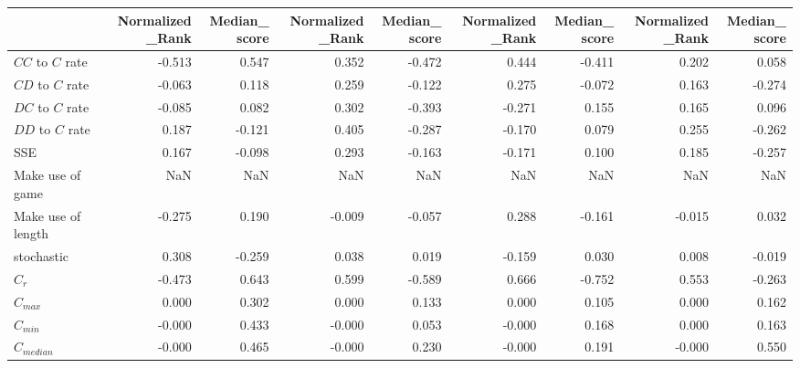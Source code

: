 \begin{tabular}{lrrrrrrrr}
\toprule
{} &  Normalized_Rank &  Median_score &  Normalized_Rank &  Median_score &  Normalized_Rank &  Median_score &  Normalized_Rank &  Median_score \\
\midrule
$CC$ to $C$ rate     &           -0.513 &         0.547 &            0.352 &        -0.472 &            0.444 &        -0.411 &            0.202 &         0.058 \\
$CD$ to $C$ rate     &           -0.063 &         0.118 &            0.259 &        -0.122 &            0.275 &        -0.072 &            0.163 &        -0.274 \\
$DC$ to $C$ rate     &           -0.085 &         0.082 &            0.302 &        -0.393 &           -0.271 &         0.155 &            0.165 &         0.096 \\
$DD$ to $C$ rate     &            0.187 &        -0.121 &            0.405 &        -0.287 &           -0.170 &         0.079 &            0.255 &        -0.262 \\
SSE                  &            0.167 &        -0.098 &            0.293 &        -0.163 &           -0.171 &         0.100 &            0.185 &        -0.257 \\
Make use of game     &              NaN &           NaN &              NaN &           NaN &              NaN &           NaN &              NaN &           NaN \\
Make use of length   &           -0.275 &         0.190 &           -0.009 &        -0.057 &            0.288 &        -0.161 &           -0.015 &         0.032 \\
stochastic           &            0.308 &        -0.259 &            0.038 &         0.019 &           -0.159 &         0.030 &            0.008 &        -0.019 \\
$C_r$                &           -0.473 &         0.643 &            0.599 &        -0.589 &            0.666 &        -0.752 &            0.553 &        -0.263 \\
$C_{max}$            &            0.000 &         0.302 &            0.000 &         0.133 &            0.000 &         0.105 &            0.000 &         0.162 \\
$C_{min}$            &           -0.000 &         0.433 &           -0.000 &         0.053 &           -0.000 &         0.168 &            0.000 &         0.163 \\
$C_{median}$         &           -0.000 &         0.465 &           -0.000 &         0.230 &           -0.000 &         0.191 &           -0.000 &         0.550 \\

\end{tabular}
